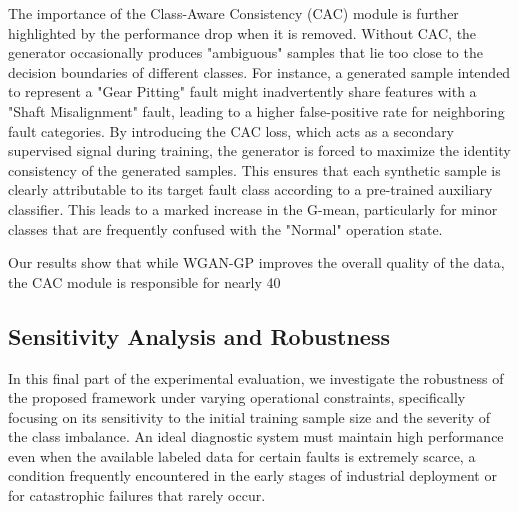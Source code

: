 \documentclass[twocolumn]{IEEEtran}
\begin{document}
The importance of the Class-Aware Consistency (CAC) module is further highlighted by the performance drop when it is removed. Without CAC, the generator occasionally produces "ambiguous" samples that lie too close to the decision boundaries of different classes. For instance, a generated sample intended to represent a "Gear Pitting" fault might inadvertently share features with a "Shaft Misalignment" fault, leading to a higher false-positive rate for neighboring fault categories. By introducing the CAC loss, which acts as a secondary supervised signal during training, the generator is forced to maximize the identity consistency of the generated samples. This ensures that each synthetic sample is clearly attributable to its target fault class according to a pre-trained auxiliary classifier. This leads to a marked increase in the G-mean, particularly for minor classes that are frequently confused with the "Normal" operation state.

Our results show that while WGAN-GP improves the overall quality of the data, the CAC module is responsible for nearly 40%

\subsection{Sensitivity Analysis and Robustness}
\label{subsec:sensitivity}

In this final part of the experimental evaluation, we investigate the robustness of the proposed framework under varying operational constraints, specifically focusing on its sensitivity to the initial training sample size and the severity of the class imbalance. An ideal diagnostic system must maintain high performance even when the available labeled data for certain faults is extremely scarce, a condition frequently encountered in the early stages of industrial deployment or for catastrophic failures that rarely occur.
\end{document}
